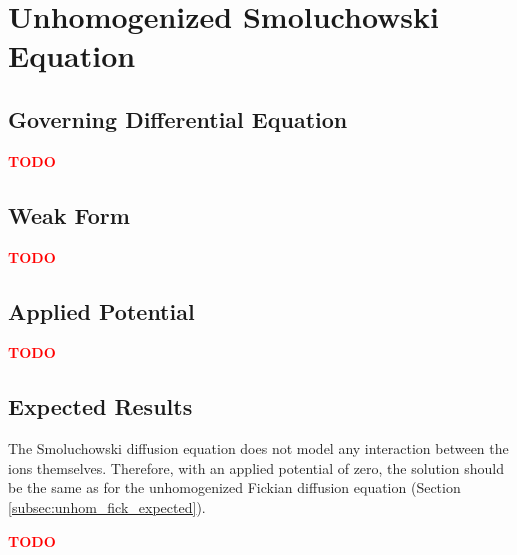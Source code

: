 
\section{Unhomogenized Smoluchowski Equation}\label{sec:unhom_smol}

\subsection{Governing Differential Equation}\label{subsec:unhom_smol_gov}

\textcolor{red}{\textbf{TODO}}

\subsection{Weak Form}\label{subsec:unhom_smol_weak}

\textcolor{red}{\textbf{TODO}}

\subsection{Applied Potential}\label{subsec:unhom_smol_potential}

\textcolor{red}{\textbf{TODO}}

\subsection{Expected Results}\label{subsec:unhom_smol_expected}

The Smoluchowski diffusion equation does not model any interaction between the ions themselves.
Therefore, with an applied potential of zero,
the solution should be the same as for the
unhomogenized Fickian diffusion equation (Section \ref{subsec:unhom_fick_expected}).

\textcolor{red}{\textbf{TODO}}

